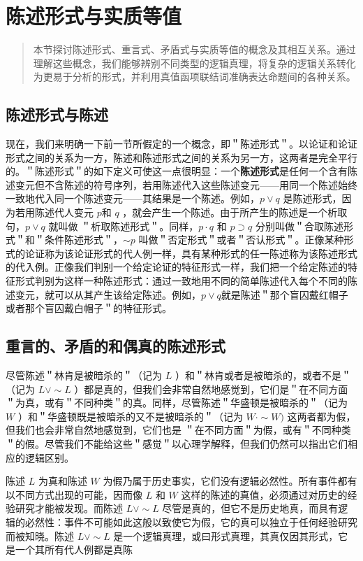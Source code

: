 \section{陈述形式与实质等值}

\begin{quotation}
本节探讨陈述形式、重言式、矛盾式与实质等值的概念及其相互关系。通过理解这些概念，我们能够辨别不同类型的逻辑真理，将复杂的逻辑关系转化为更易于分析的形式，并利用真值函项联结词准确表达命题间的各种关系。
\end{quotation}

\subsection{陈述形式与陈述}
现在，我们来明确一下前一节所假定的一个概念，即＂陈述形式＂。以论证和论证形式之间的关系为一方，陈述和陈述形式之间的关系为另一方，这两者是完全平行的。＂陈述形式＂的如下定义可使这一点很明显：一个\textbf{陈述形式}是任何一个含有陈述变元但不含陈述的符号序列，若用陈述代入这些陈述变元——用同一个陈述始终一致地代入同一个陈述变元——其结果是一个陈述。例如，$p \vee q$ 是陈述形式，因为若用陈述代人变元 $p$和 $q$ ，就会产生一个陈述。由于所产生的陈述是一个析取句，$p \vee q$ 就叫做 ＂析取陈述形式＂。同样，$p \cdot q$ 和 $p \supset q$ 分别叫做＂合取陈述形式＂和＂条件陈述形式＂，$\sim p$ 叫做＂否定形式＂或者＂否认形式＂。正像某种形式的论证称为该论证形式的代人例一样，具有某种形式的任一陈述称为该陈述形式的代入例。正像我们判别一个给定论证的特征形式一样，我们把一个给定陈述的特征形式判别为这样一种陈述形式：通过一致地用不同的简单陈述代入每个不同的陈述变元，就可以从其产生该给定陈述。例如，$p \vee q$就是陈述＂那个盲囚戴红帽子或者那个盲囚戴白帽子＂的特征形式。

\subsection{重言的、矛盾的和偶真的陈述形式}
尽管陈述＂林肯是被暗杀的＂（记为 $L$ ）和＂林肯或者是被暗杀的，或者不是＂（记为 $L \vee \sim L$ ）都是真的，但我们会非常自然地感觉到，它们是＂在不同方面＂为真，或有＂不同种类＂的真。同样，尽管陈述＂华盛顿是被暗杀的＂（记为 $W$ ）和＂华盛顿既是被暗杀的又不是被暗杀的＂（记为 $W \cdot \sim W)$ 这两者都为假，但我们也会非常自然地感觉到，它们也是 ＂在不同方面＂为假，或有＂不同种类＂的假。尽管我们不能给这些＂感觉＂以心理学解释，但我们仍然可以指出它们相应的逻辑区别。

陈述 $L$ 为真和陈述 $W$ 为假乃属于历史事实，它们没有逻辑必然性。所有事件都有以不同方式出现的可能，因而像 $L$ 和 $W$ 这样的陈述的真值，必须通过对历史的经验研究才能被发现。而陈述 $L \vee \sim L$ 尽管是真的，但它不是历史地真，而具有逻辑的必然性：事件不可能如此这般以致使它为假，它的真可以独立于任何经验研究而被知晓。陈述 $L \vee \sim L$ 是一个逻辑真理，或曰形式真理，其真仅因其形式，它是一个其所有代人例都是真陈


